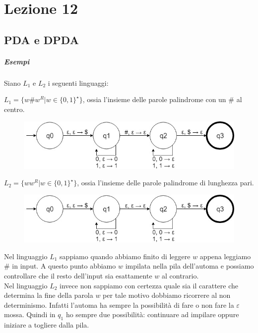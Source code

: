 
\section{Lezione 12}
\subsection{PDA e DPDA}
\subparagraph{Esempi} Siano $L_1$ e $L_2$ i seguenti linguaggi:
\begin{description}
	\item $L_1 = \{ w\#w^R | w \in \{0,1\}^{\star}\}$, ossia l'insieme delle parole palindrome con un $\#$ al centro. \\
	\begin{figure}[H]
		\includegraphics[scale=0.5]{pda1}
	\end{figure}
	\item $L_2 = \{ ww^R | w \in \{0,1\}^{\star}\}$, ossia l'insieme delle parole palindrome di lunghezza pari. \\
	\begin{figure}[H]
		\includegraphics[scale=0.5]{pda2}
	\end{figure}
\end{description}
Nel linguaggio $L_1$ sappiamo quando abbiamo finito di leggere $w$ appena leggiamo $\#$ in input. A questo punto abbiamo $w$ impilata nella pila dell'automa e possiamo controllare che il resto dell'input sia esattamente $w$ al contrario.\\
Nel linguaggio $L_2$ invece non sappiamo con certezza quale sia il carattere che determina la fine della parola $w$ per tale motivo dobbiamo ricorrere al non determinismo. Infatti l'automa ha sempre la possibilit\`a di fare o non fare la $\varepsilon$ mossa. Quindi in $q_1$ ho sempre due possibilit\`a: continuare ad impilare oppure iniziare a togliere dalla pila. \\

